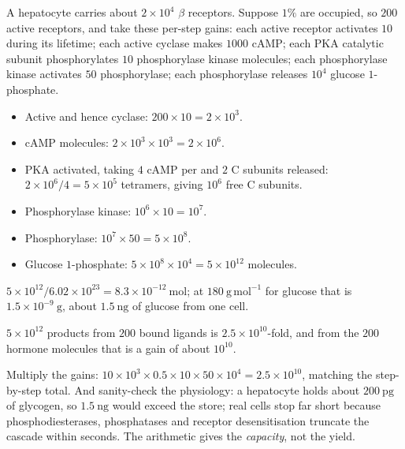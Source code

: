 \begin{calcbox}[title={WORKED: the amplification arithmetic}]
A hepatocyte carries about $2\times10^{4}$ $\beta$ receptors. Suppose $1\%$ are
occupied, so $200$ active receptors, and take these per-step gains: each active
receptor activates $10$  during its lifetime; each active cyclase makes
$1000$ cAMP; each PKA catalytic subunit phosphorylates $10$ phosphorylase kinase
molecules; each phosphorylase kinase activates $50$ phosphorylase; each phosphorylase
releases $10^{4}$ glucose $1$-phosphate.

\begin{itemize}
\item Active  and hence cyclase: $200 \times 10 = 2\times10^{3}$.
\item cAMP molecules: $2\times10^{3} \times 10^{3} = 2\times10^{6}$.
\item PKA activated, taking $4$ cAMP per  and $2$ C subunits released:
$2\times10^{6}/4 = 5\times10^{5}$ tetramers, giving $10^{6}$ free C subunits.
\item Phosphorylase kinase: $10^{6}\times 10 = 10^{7}$.
\item Phosphorylase: $10^{7}\times 50 = 5\times10^{8}$.
\item Glucose $1$-phosphate: $5\times10^{8}\times10^{4}=5\times10^{12}$ molecules.
\end{itemize}
$5\times10^{12}/6.02\times10^{23}=8.3\times10^{-12}\ \mathrm{mol}$; at
$180\ \mathrm{g\,mol^{-1}}$ for glucose that is $1.5\times10^{-9}\ \mathrm{g}$, about
$1.5\ \mathrm{ng}$ of glucose from one cell.

 $5\times10^{12}$ products from $200$ bound ligands is
$2.5\times10^{10}$-fold, and from the $200$ hormone molecules that is a gain of about
$10^{10}$.

 Multiply the gains: $10\times10^{3}\times0.5\times10\times50
\times10^{4}=2.5\times10^{10}$, matching the step-by-step total. \tm{$\surd$} And
sanity-check the physiology: a hepatocyte holds about $200\ \mathrm{pg}$ of glycogen,
so $1.5\ \mathrm{ng}$ would exceed the store; real cells stop far short because
phosphodiesterases, phosphatases and receptor desensitisation truncate the cascade
within seconds. The arithmetic gives the \emph{capacity}, not the yield. \tm{$\surd$}
\end{calcbox}

